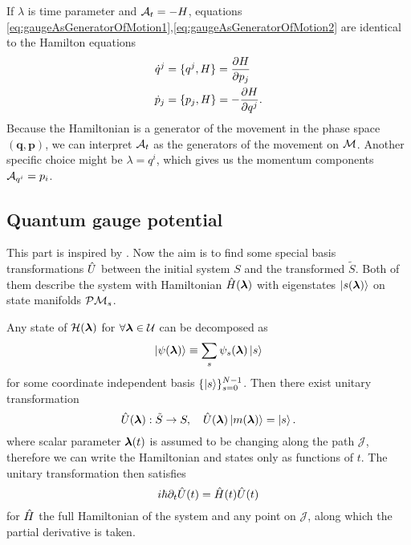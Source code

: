 If $\lambda$ is time parameter and $\mathcal{A}_t=-H$, equations \ref{eq:gaugeAsGeneratorOfMotion1},\ref{eq:gaugeAsGeneratorOfMotion2} are identical to the Hamilton equations
\begin{equation}
\begin{split}
    \dot{q}^j&=\{q^j,H\} = \frac{\partial H}{\partial p_j}\\
    \dot{p}_j&=\{p_j,H\} = -\frac{\partial H}{\partial q^j}.
\end{split}
\end{equation}
Because the Hamiltonian is a generator of the movement in the phase space $(\bm{q},\bm{p})$, we can interpret $\mathcal{A}_t$ as the generators of the movement on $\mathcal{M}$. Another specific choice might be $\lambda=q^i$, which gives us the momentum components $\mathcal{A}_{q^i}=p_i$.



\subsection{Quantum gauge potential}
This part is inspired by \citet[Chap. 2.2]{kolodrubez}.
Now the aim is to find some special basis transformations $\hat{U}$ between the initial system $S$ and the transformed $\tilde{S}$. Both of them describe the system with Hamiltonian $\hat{H}({\bm\lambda})$ with eigenstates $\ket{s({\bm\lambda})}$ on state manifolds $\mathcal{P}\mathcal{M}_s$. 

Any state of $\mathcal{H}({\bm\lambda})$ for $\forall {\bm\lambda}\in \mathcal U$ can be decomposed as
    \begin{equation}
    \ket{\psi({\bm\lambda})}\equiv \sum_s \psi_s({\bm\lambda})\ket{s}
\end{equation}    
for some coordinate independent basis $\{\ket{s}\}_{s=0}^{N-1}$.
Then there exist unitary transformation
\begin{equation}
    \hat{U}({\bm\lambda}): \tilde S\rightarrow S,\quad \hat{U}({\bm\lambda})\ket{m({\bm\lambda})}=\ket{s}.
    \label{eq:transformationU}
\end{equation}
where scalar parameter ${\bm\lambda}(t)$ is assumed to be changing along the path $\mathcal J$, therefore we can write the Hamiltonian and states only as functions of $t$. The unitary transformation then satisfies
\begin{equation}
    i\hbar \partial_t \hat{U}(t)=\hat{H}(t)\hat{U}(t)
    \label{eq:schrodingerForU}
\end{equation}
for $\hat{H}$ the full Hamiltonian of the system and any point on $\mathcal J$, along which the partial derivative is taken.


